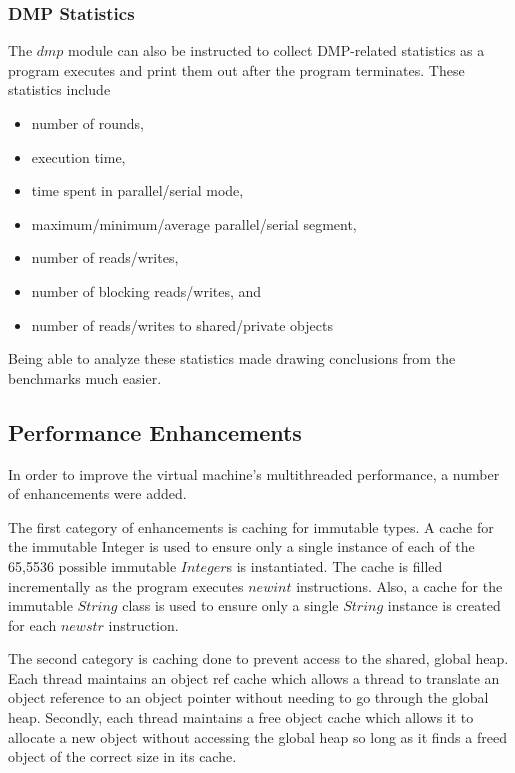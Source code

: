 \subsubsection{DMP Statistics}

The $dmp$ module can also be instructed to collect DMP-related
statistics as a program executes and print them out after the program
terminates.  These statistics include

\begin{itemize}
\item number of rounds,
\item execution time,
\item time spent in parallel/serial mode,
\item maximum/minimum/average parallel/serial segment,
\item number of reads/writes,
\item number of blocking reads/writes, and
\item number of reads/writes to shared/private objects
\end{itemize}

Being able to analyze these statistics made drawing conclusions from
the benchmarks much easier.

\subsection{Performance Enhancements}

In order to improve the virtual machine's multithreaded performance, a
number of enhancements were added.

The first category of enhancements is caching for immutable types.  A
cache for the immutable Integer is used to ensure only a single
instance of each of the 65,5536 possible immutable $Integer$s is
instantiated.  The cache is filled incrementally as the program
executes $newint$ instructions.  Also, a cache for the immutable
$String$ class is used to ensure only a single $String$ instance is
created for each $newstr$ instruction.

The second category is caching done to prevent access to the shared,
global heap.  Each thread maintains an object ref cache which allows a
thread to translate an object reference to an object pointer without
needing to go through the global heap.  Secondly, each thread
maintains a free object cache which allows it to allocate a new object
without accessing the global heap so long as it finds a freed object
of the correct size in its cache.


